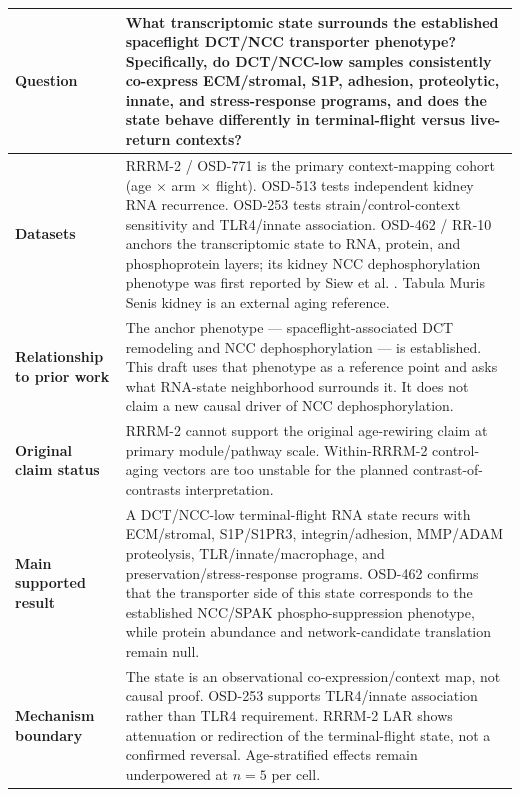 \documentclass[11pt]{article}
\begin{document}
\vspace{0.6em}
\small
\begin{tabularx}{\textwidth}{>{\bfseries}p{}X}
\toprule
Question & What transcriptomic state surrounds the established spaceflight DCT/NCC transporter phenotype? Specifically, do DCT/NCC-low samples consistently co-express ECM/stromal, S1P, adhesion, proteolytic, innate, and stress-response programs, and does the state behave differently in terminal-flight versus live-return contexts? \\
\midrule
Datasets & RRRM-2 / OSD-771 is the primary context-mapping cohort (age $\times$ arm $\times$ flight). OSD-513 tests independent kidney RNA recurrence. OSD-253 tests strain/control-context sensitivity and TLR4/innate association. OSD-462 / RR-10 anchors the transcriptomic state to RNA, protein, and phosphoprotein layers; its kidney NCC dephosphorylation phenotype was first reported by Siew et al. \citep{siew2024cosmic}. Tabula Muris Senis kidney is an external aging reference. \\
\midrule
Relationship to prior work & The anchor phenotype --- spaceflight-associated DCT remodeling and NCC dephosphorylation --- is established. This draft uses that phenotype as a reference point and asks what RNA-state neighborhood surrounds it. It does not claim a new causal driver of NCC dephosphorylation. \\
\midrule
Original claim status & RRRM-2 cannot support the original age-rewiring claim at primary module/pathway scale. Within-RRRM-2 control-aging vectors are too unstable for the planned contrast-of-contrasts interpretation. \\
\midrule
Main supported result & A DCT/NCC-low terminal-flight RNA state recurs with ECM/stromal, S1P/S1PR3, integrin/adhesion, MMP/ADAM proteolysis, TLR/innate/macrophage, and preservation/stress-response programs. OSD-462 confirms that the transporter side of this state corresponds to the established NCC/SPAK phospho-suppression phenotype, while protein abundance and network-candidate translation remain null. \\
\midrule
Mechanism boundary & The state is an observational co-expression/context map, not causal proof. OSD-253 supports TLR4/innate association rather than TLR4 requirement. RRRM-2 LAR shows attenuation or redirection of the terminal-flight state, not a confirmed reversal. Age-stratified effects remain underpowered at $n=5$ per cell. \\
\bottomrule
\end{tabularx}
\normalsize
\end{document}
